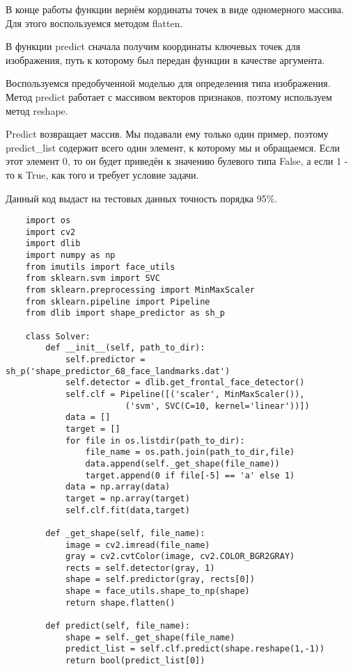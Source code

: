 В конце работы функции вернём кординаты точек в виде одномерного массива. Для этого воспользуемся методом flatten.

В функции predict сначала получим координаты ключевых точек для изображения, путь к которому был передан функции в качестве аргумента.

Воспользуемся предобученной моделью для определения типа изображения. Метод predict работает с массивом векторов признаков, поэтому используем метод reshape.

Predict возвращает массив. Мы подавали ему только один пример, поэтому predict\_list содержит всего один элемент, к которому мы и обращаемся. Если этот элемент 0, то он будет приведён к значению булевого типа False, а если 1 - то к True, как того и требует условие задачи.

Данный код выдаст на тестовых данных точность порядка 95\%.

\begin{verbatim}
    import os
    import cv2
    import dlib
    import numpy as np
    from imutils import face_utils
    from sklearn.svm import SVC
    from sklearn.preprocessing import MinMaxScaler
    from sklearn.pipeline import Pipeline
    from dlib import shape_predictor as sh_p

    class Solver:
        def __init__(self, path_to_dir):
            self.predictor = sh_p('shape_predictor_68_face_landmarks.dat')
            self.detector = dlib.get_frontal_face_detector()
            self.clf = Pipeline([('scaler', MinMaxScaler()),
                        ('svm', SVC(C=10, kernel='linear'))])
            data = []
            target = []
            for file in os.listdir(path_to_dir):
                file_name = os.path.join(path_to_dir,file)
                data.append(self._get_shape(file_name))
                target.append(0 if file[-5] == 'a' else 1)
            data = np.array(data)
            target = np.array(target)
            self.clf.fit(data,target)
            
        def _get_shape(self, file_name):
            image = cv2.imread(file_name)
            gray = cv2.cvtColor(image, cv2.COLOR_BGR2GRAY)
            rects = self.detector(gray, 1)
            shape = self.predictor(gray, rects[0])
            shape = face_utils.shape_to_np(shape)
            return shape.flatten()
        
        def predict(self, file_name):
            shape = self._get_shape(file_name)
            predict_list = self.clf.predict(shape.reshape(1,-1))
            return bool(predict_list[0])

\end{verbatim}

